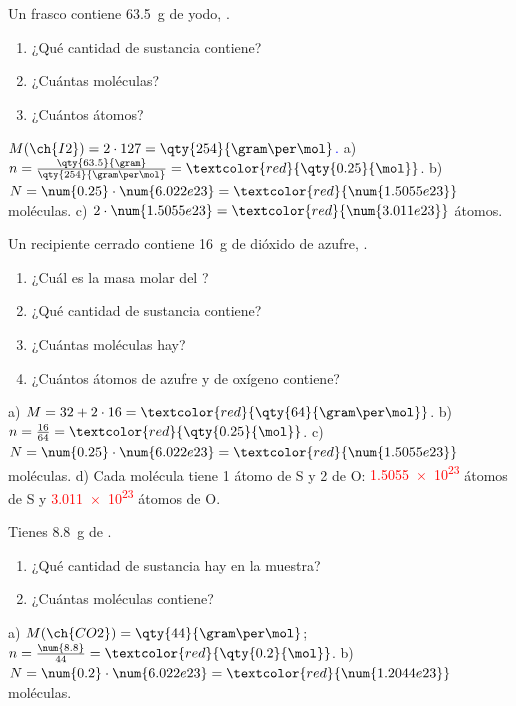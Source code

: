 \begin{exercise}
    Un frasco contiene \qty{63.5}{\gram} de yodo, .
    \begin{enumerate}[label=\alph*)]
        \item ¿Qué cantidad de sustancia contiene?
        \item ¿Cuántas moléculas?
        \item ¿Cuántos átomos?
    \end{enumerate}
    \begin{solu}
        \textcolor{blue}{\(M(\ch{I2}) = 2 \cdot 127 = \qty{254}{\gram\per\mol}\).}
        a) \(n = \frac{\qty{63.5}{\gram}}{\qty{254}{\gram\per\mol}} = \textcolor{red}{\qty{0.25}{\mol}}\). b) \(N = \num{0.25} \cdot \num{6.022e23} = \textcolor{red}{\num{1.5055e23}}\) moléculas. c) \(2 \cdot \num{1.5055e23} = \textcolor{red}{\num{3.011e23}}\) átomos.
    \end{solu}
\end{exercise}

\begin{exercise}
    Un recipiente cerrado contiene \qty{16}{\gram} de dióxido de azufre, .
    \begin{enumerate}[label=\alph*)]
        \item ¿Cuál es la masa molar del ?
        \item ¿Qué cantidad de sustancia contiene?
        \item ¿Cuántas moléculas hay?
        \item ¿Cuántos átomos de azufre y de oxígeno contiene?
    \end{enumerate}
    \begin{solu}
        a) \(M = 32 + 2 \cdot 16 = \textcolor{red}{\qty{64}{\gram\per\mol}}\). b) \(n = \frac{16}{64} = \textcolor{red}{\qty{0.25}{\mol}}\). c) \(N = \num{0.25} \cdot \num{6.022e23} = \textcolor{red}{\num{1.5055e23}}\) moléculas. d) Cada molécula tiene 1 átomo de S y 2 de O: \textcolor{red}{\num{1.5055e23}} átomos de S y \textcolor{red}{\num{3.011e23}} átomos de O.
    \end{solu}
\end{exercise}

\begin{exercise}
    Tienes \qty{8.8}{\gram} de .
    \begin{enumerate}[label=\alph*)]
        \item ¿Qué cantidad de sustancia hay en la muestra?
        \item ¿Cuántas moléculas contiene?
    \end{enumerate}
    \begin{solu}
        a) \(M(\ch{CO2}) = \qty{44}{\gram\per\mol}\); \(n = \frac{\num{8.8}}{44} = \textcolor{red}{\qty{0.2}{\mol}}\). b) \(N = \num{0.2} \cdot \num{6.022e23} = \textcolor{red}{\num{1.2044e23}}\) moléculas.
    \end{solu}
\end{exercise}

